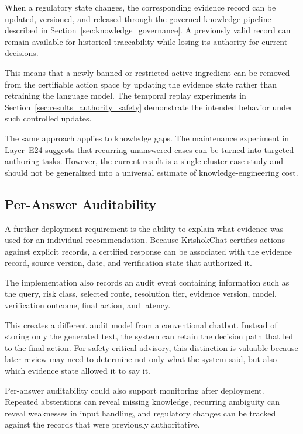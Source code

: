 \documentclass[a4paper,fleqn]{cas-dc}
\begin{document}
When a regulatory state changes, the corresponding evidence record can be updated, versioned, and released through the governed knowledge pipeline described in Section~\ref{sec:knowledge_governance}. A previously valid record can remain available for historical traceability while losing its authority for current decisions.

This means that a newly banned or restricted active ingredient can be removed from the certifiable action space by updating the evidence state rather than retraining the language model. The temporal replay experiments in Section~\ref{sec:results_authority_safety} demonstrate the intended behavior under such controlled updates. 

The same approach applies to knowledge gaps. The maintenance experiment in Layer~E24 suggests that recurring unanswered cases can be turned into targeted authoring tasks. However, the current result is a single-cluster case study and should not be generalized into a universal estimate of knowledge-engineering cost. 

\subsection{Per-Answer Auditability}

A further deployment requirement is the ability to explain what evidence was used for an individual recommendation. Because KrishokChat certifies actions against explicit records, a certified response can be associated with the evidence record, source version, date, and verification state that authorized it.

The implementation also records an audit event containing information such as the query, risk class, selected route, resolution tier, evidence version, model, verification outcome, final action, and latency. 

This creates a different audit model from a conventional chatbot. Instead of storing only the generated text, the system can retain the decision path that led to the final action. For safety-critical advisory, this distinction is valuable because later review may need to determine not only what the system said, but also which evidence state allowed it to say it.

Per-answer auditability could also support monitoring after deployment. Repeated abstentions can reveal missing knowledge, recurring ambiguity can reveal weaknesses in input handling, and regulatory changes can be tracked against the records that were previously authoritative.
\end{document}
